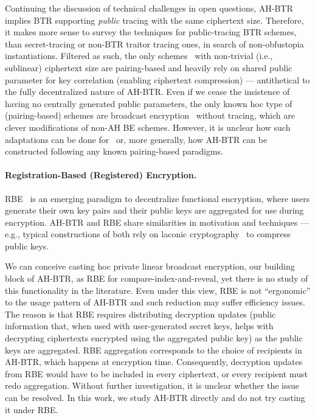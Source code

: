 Continuing the discussion of technical challenges in open questions,
AH-BTR implies BTR supporting \emph{public} tracing
with the same ciphertext size.
Therefore, it makes more sense to survey
the techniques for public-tracing BTR schemes,
than secret-tracing or non-BTR traitor tracing ones,
in search of non-obfustopia instantiations.
Filtered as such,
the only schemes~\cite{CCS:BonWat06,CCS:GKSW10}
with non-trivial (i.e., sublinear) ciphertext size
are pairing-based and
heavily rely on shared public parameter for key correlation
(enabling ciphertext compression)
---
antithetical to the fully decentralized nature of AH-BTR\@.
Even if we cease
the insistence of having no centrally generated public parameters,
the only known \ad hoc type of (pairing-based) schemes are
broadcast encryption~\cite{CCS:WQZD10,AC:KolMalWee23} without tracing,
which are clever modifications of non-AH BE schemes.
However, it is unclear
how such adaptations can be done for~\cite{CCS:BonWat06,CCS:GKSW10}
or, more generally,
how AH-BTR can be constructed following any known pairing-based paradigms.

\paragraph{Registration-Based (Registered) Encryption.}
RBE~\cite{TCC:GHMR18,PKC:GHMRS19,C:GoyVus20,IMA:ConEldSma21,CCS:GKMR23,EC:HLWW23,C:FreWatWu23,AC:FioKolPer23,AC:FFMMRV23,AC:ZZGQ23,EC:ZLZGQ24,C:GLWW24}
is an emerging paradigm to decentralize functional encryption,
where users generate their own key pairs
and
their public keys are aggregated for use during encryption.
AH-BTR and RBE share similarities in
motivation and techniques ---
e.g.,
typical constructions of both rely on laconic cryptography~\cite{C:CDGGMP17}
to compress public keys.

We can conceive casting \ad hoc private linear broadcast encryption,
our building block of AH-BTR,
as RBE for compare-index-and-reveal,
yet there is no study of this functionality in the literature.
Even under this view,
RBE is not ``ergonomic'' to the usage pattern of AH-BTR
and
such reduction may suffer efficiency issues.
The reason is that RBE requires
distributing decryption updates
(public information that, when used with user-generated secret keys,
helps with decrypting ciphertexts encrypted using the aggregated public key)
as the public keys are aggregated.
RBE aggregation corresponds to the choice of recipients in AH-BTR,
which happens at encryption time.
Consequently,
decryption updates from RBE would have to be included in every ciphertext,
or
every recipient must redo aggregation.
Without further investigation,
it is unclear whether the issue can be resolved.
In this work,
we study AH-BTR directly and do not try casting it under RBE\@.

